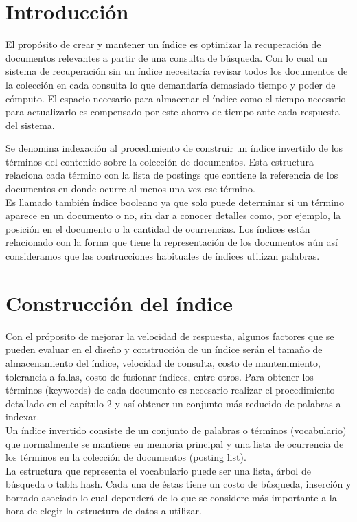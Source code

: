 
\section{Introducción}

El propósito de crear y mantener un índice es optimizar la recuperación de documentos relevantes a partir de una consulta de búsqueda. Con lo cual un sistema de recuperación sin un índice necesitaría revisar todos los documentos de la colección en cada consulta lo que demandaría demasiado tiempo y poder de cómputo. El espacio necesario para almacenar el índice como el tiempo necesario para actualizarlo es compensado por este ahorro de tiempo ante cada respuesta del sistema. \par

Se denomina indexación al procedimiento de construir un índice invertido de los términos del contenido sobre la colección de documentos. Esta estructura relaciona cada término con la lista de postings que contiene la referencia de los documentos en donde ocurre al menos una vez ese término. \\
Es llamado también índice booleano ya que solo puede determinar si un término aparece en un documento o no, sin dar a conocer detalles como, por ejemplo, la posición en el documento o la cantidad de ocurrencias. Los índices están relacionado con la forma que tiene la representación de los documentos aún así consideramos que las contrucciones habituales de índices utilizan palabras.\par


\section{Construcción del índice}

Con el próposito de mejorar la velocidad de respuesta, algunos factores que se pueden evaluar en el diseño y construcción de un índice serán el tamaño de almacenamiento del índice, velocidad de consulta, costo de mantenimiento, tolerancia a fallas, costo de fusionar índices, entre otros.
Para obtener los términos (keywords) de cada documento es necesario realizar el procedimiento detallado en el capítulo 2 y así obtener un conjunto más reducido de palabras a indexar. \\
Un índice invertido consiste de un conjunto de palabras o términos (vocabulario) que normalmente se mantiene en memoria principal y una lista de ocurrencia de los términos en la colección de documentos (posting list).\\
La estructura que representa el vocabulario puede ser una lista, árbol de búsqueda o tabla hash. Cada una de éstas tiene un costo de búsqueda, inserción y borrado asociado lo cual dependerá de lo que se considere más importante a la hora de elegir la estructura de datos a utilizar.\\


